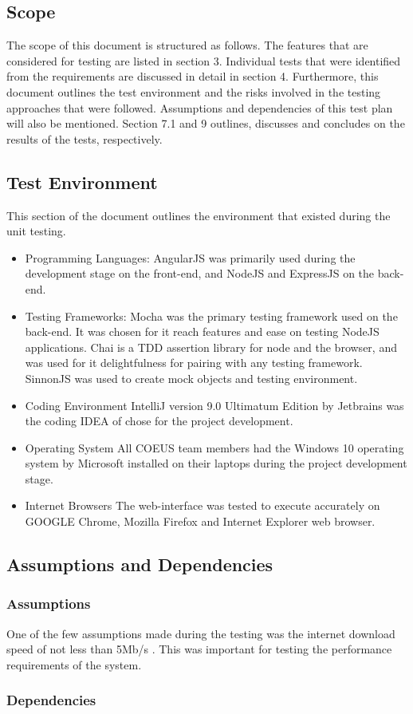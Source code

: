 \subsection{Scope}

The scope of this document is structured as follows. The features that are considered for testing are listed in section 3. Individual tests that were identified from the requirements are
discussed in detail in section 4. Furthermore, this document outlines the test environment
and the risks involved in the testing approaches that were followed. Assumptions and
dependencies of this test plan will also be mentioned. Section 7.1 and 9 outlines,
discusses and concludes on the results of the tests, respectively.


\subsection{Test Environment}

This section of the document outlines the environment that existed during the unit testing.

\begin{itemize}

	\item Programming Languages:
			AngularJS was primarily used during the development 		stage on the front-end, and NodeJS and ExpressJS on the back-end.
	\item Testing Frameworks:
			Mocha was the primary testing framework used on the back-end. It was chosen for it reach features and ease on testing NodeJS applications. Chai is a TDD assertion library for node and the browser, and was used for it delightfulness for pairing with any testing framework. SinnonJS was used to create mock objects and testing environment.
	\item Coding Environment
			IntelliJ version 9.0 Ultimatum Edition by Jetbrains was the coding IDEA of chose for the project development.
	\item Operating System
			All COEUS team members had the Windows 10 operating system by Microsoft installed on their laptops during the project development stage.
	\item Internet Browsers
			The web-interface was tested to execute accurately on GOOGLE Chrome, Mozilla Firefox and Internet Explorer web browser. 
	
\end{itemize}



\subsection{Assumptions and Dependencies}
\subsubsection{Assumptions}
One of the few assumptions made during the testing was the internet download speed of not less than 5Mb/s \cite{downloadSpeed}. This was important for testing the performance requirements of the system.

\subsubsection{Dependencies}



